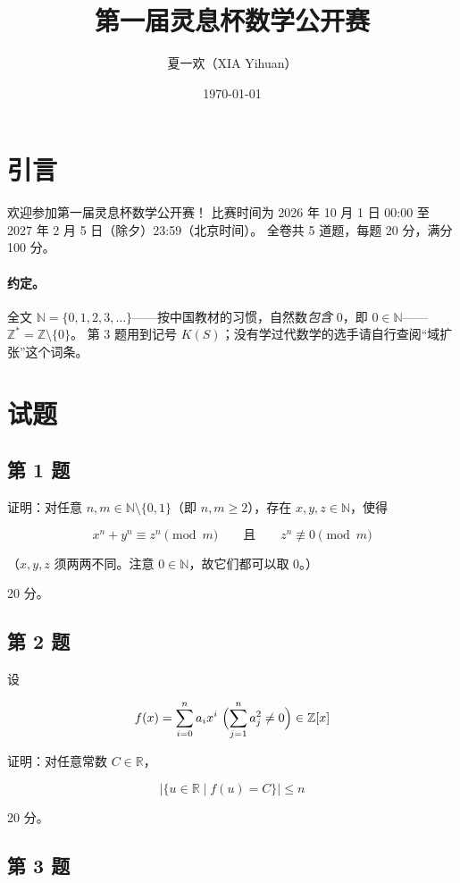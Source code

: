 \documentclass[UTF8]{ctexart}
\title{第一届灵息杯数学公开赛}
\author{夏一欢（XIA Yihuan）}
\date{\today}
\begin{document}
\maketitle

\section{引言}

欢迎参加第一届灵息杯数学公开赛！
比赛时间为 2026 年 10 月 1 日 00:00 至 2027 年 2 月 5 日（除夕）23:59（北京时间）。
全卷共 5 道题，每题 20 分，满分 100 分。

\paragraph{约定。}
全文 $\mathbb{N}=\{0,1,2,3,\ldots\}$——按中国教材的习惯，自然数\emph{包含}
$0$，即 $0\in\mathbb{N}$——
$\mathbb{Z}^{*}=\mathbb{Z}\setminus\{0\}$。
第 3 题用到记号 $K(S)$；没有学过代数学的选手请自行查阅``域扩张''这个词条。

\section{试题}
\subsection{第 1 题}

证明：对任意 $n,m\in\mathbb{N}\setminus\{0,1\}$（即 $n,m\ge 2$），存在
$x,y,z\in\mathbb{N}$，使得

$$x^n+y^n \equiv z^n \pmod{m}
\qquad\text{且}\qquad
z^n \not\equiv 0 \pmod{m}$$

（$x,y,z$ 须两两不同。注意 $0\in\mathbb{N}$，故它们都可以取 $0$。）

20 分。

\subsection{第 2 题}

设

$$f(x)=\sum_{i=0}^n a_i x^i\ \Bigl(\sum_{j=1}^n a_j^2\neq 0\Bigr)\in \mathbb{Z}[x]$$

证明：对任意常数 $C\in \mathbb{R}$，

$${\lvert\{u \in \mathbb{R}\mid f(u) = C\}\rvert\leq n}$$

20 分。

\subsection{第 3 题}
\end{document}
